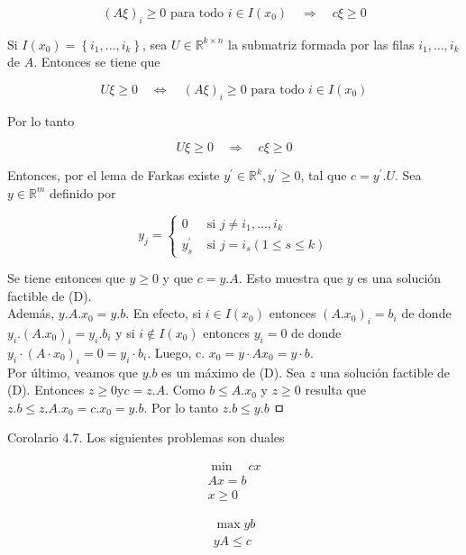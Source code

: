 \documentclass[10pt]{article}
\begin{document}
$$
(A \xi)_{i} \geq 0 \text { para todo } i \in I\left(x_{0}\right) \quad \Longrightarrow \quad c \xi \geq 0
$$

Si $I\left(x_{0}\right)=\left\{i_{1}, \ldots, i_{k}\right\}$, sea $U \in \mathbb{R}^{k \times n}$ la submatriz formada por las filas $i_{1}, \ldots, i_{k}$ de $A$. Entonces se tiene que

$$
U \xi \geq 0 \quad \Longleftrightarrow \quad(A \xi)_{i} \geq 0 \text { para todo } i \in I\left(x_{0}\right)
$$

Por lo tanto

$$
U \xi \geq 0 \quad \Longrightarrow \quad c \xi \geq 0
$$

Entonces, por el lema de Farkas existe $y^{\prime} \in \mathbb{R}^{k}, y^{\prime} \geq 0$, tal que $c=y^{\prime} . U$. Sea $y \in \mathbb{R}^{m}$ definido por

$$
y_{j}= \begin{cases}0 & \text { si } j \neq i_{1}, \ldots, i_{k} \\ y_{s}^{\prime} & \text { si } j=i_{s}(1 \leq s \leq k)\end{cases}
$$

Se tiene entonces que $y \geq 0$ y que $c=y . A$. Esto muestra que $y$ es una solución factible de (D).\\
Además, $y . A . x_{0}=y . b$. En efecto, si $i \in I\left(x_{0}\right)$ entonces $\left(A . x_{0}\right)_{i}=b_{i}$ de donde $y_{i} .\left(A . x_{0}\right)_{i}=y_{i} . b_{i}$ y si $i \notin I\left(x_{0}\right)$ entonces $y_{i}=0$ de donde $y_{i} \cdot\left(A \cdot x_{0}\right)_{i}=0=y_{i} \cdot b_{i}$. Luego, c. $x_{0}=y \cdot A x_{0}=y \cdot b$.\\
Por último, veamos que $y . b$ es un máximo de (D). Sea $z$ una solución factible de (D). Entonces $z \geq 0 \mathrm{y} c=z . A$. Como $b \leq A . x_{0}$ y $z \geq 0$ resulta que $z . b \leq z . A . x_{0}=c . x_{0}=y . b$. Por lo tanto $z . b \leq y . b$ ㅁ

Corolario 4.7. Los siguientes problemas son duales


\begin{gather*}
\min \quad c x \\
A x=b  \tag{$\prime$}\\
x \geq 0
\end{gather*}


$$
\begin{gathered}
\max y b \\
y A \leq c
\end{gathered}
$$
\end{document}
